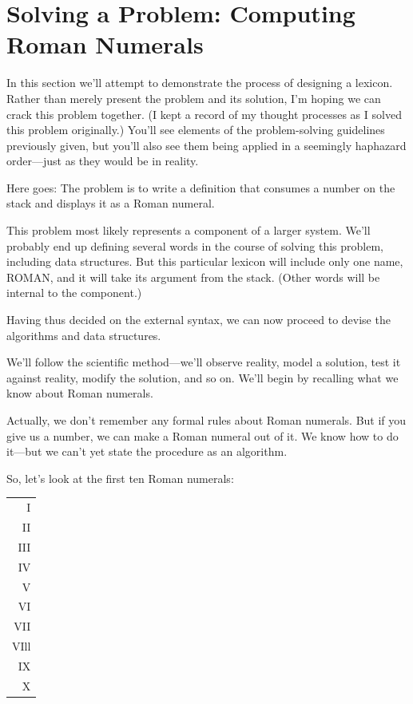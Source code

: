 \section{Solving a Problem: Computing Roman Numerals}

In this section we'll attempt to demonstrate the process of designing a
lexicon. Rather than merely present the problem and its solution, I'm
hoping we can crack this problem together. (I kept a record of my
thought processes as I solved this problem originally.) You'll see
elements of the problem-solving guidelines previously given, but you'll
also see them being applied in a seemingly haphazard order---just as they
would be in reality.

Here goes: The problem is to write a definition that consumes a
number on the stack and displays it as a Roman numeral.

This problem most likely represents a component of a larger
system. We'll probably end up defining several words in the course of
solving this problem, including data structures. But this particular
lexicon will include only one name, ROMAN, and it will take its argument
from the stack. (Other words will be internal to the component.)

Having thus decided on the external syntax, we can now proceed to
devise the algorithms and data structures.

We'll follow the scientific method---we'll observe reality, model a
solution, test it against reality, modify the solution, and so on. We'll
begin by recalling what we know about Roman numerals.

Actually, we don't remember any formal rules about Roman
numerals. But if you give us a number, we can make a Roman numeral
out of it. We know how to do it---but we can't yet state the procedure as
an algorithm.

So, let's look at the first ten Roman numerals:

\bigskip
{\sf\begin{tabular}{r}
I \\
II \\
III \\
IV \\
V \\
VI \\
VII \\
VIll \\
IX \\
X \\
\end{tabular}}
\bigskip

